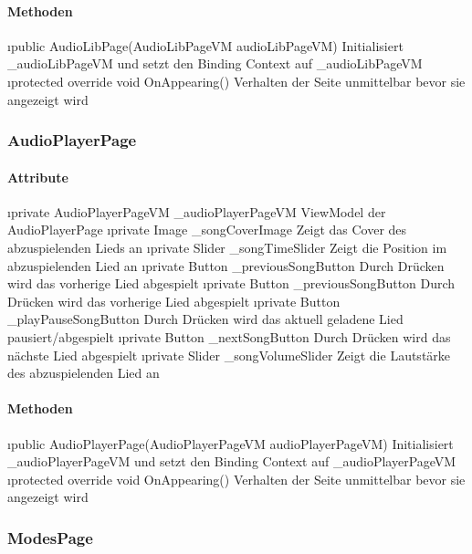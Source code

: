 \documentclass[../entwurf.tex]{subfiles}
\begin{document}
\paragraph{Methoden}
\begin{itemize}
	\i{public AudioLibPage(AudioLibPageVM audioLibPageVM)} Initialisiert \_audioLibPageVM und setzt den Binding Context 			auf \_audioLibPageVM
	\i{protected override void OnAppearing()} Verhalten der Seite unmittelbar bevor sie angezeigt wird
\end{itemize}

\subsubsection{AudioPlayerPage}

\paragraph{Attribute}
\begin{itemize}
	\i{private AudioPlayerPageVM \_audioPlayerPageVM} ViewModel der AudioPlayerPage
	\i{private Image \_songCoverImage} Zeigt das Cover des abzuspielenden Lieds an
	\i{private Slider \_songTimeSlider} Zeigt die Position im abzuspielenden Lied an
	\i{private Button \_previousSongButton} Durch Drücken wird das vorherige Lied abgespielt
	\i{private Button \_previousSongButton} Durch Drücken wird das vorherige Lied abgespielt
	\i{private Button \_playPauseSongButton} Durch Drücken wird das aktuell geladene Lied pausiert/abgespielt
	\i{private Button \_nextSongButton} Durch Drücken wird das nächste Lied abgespielt
	\i{private Slider \_songVolumeSlider} Zeigt die Lautstärke des abzuspielenden Lied an
\end{itemize}

\paragraph{Methoden}

\begin{itemize}
	\i{public AudioPlayerPage(AudioPlayerPageVM audioPlayerPageVM)} Initialisiert \_audioPlayerPageVM und setzt den Binding Context 			auf \_audioPlayerPageVM
	\i{protected override void OnAppearing()} Verhalten der Seite unmittelbar bevor sie angezeigt wird
\end{itemize}

\subsubsection{ModesPage}
\end{document}
